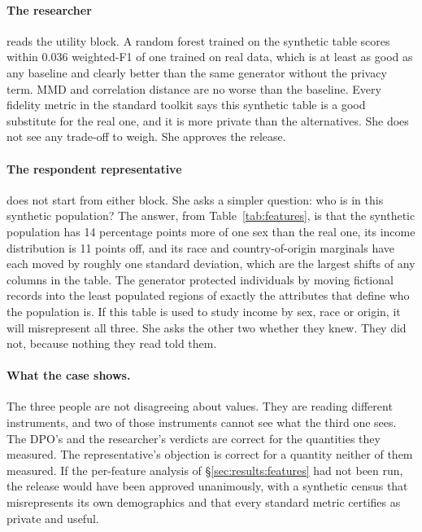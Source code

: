 \documentclass[11pt,a4paper]{article}
\begin{document}
\paragraph{The researcher} reads the utility block. A random forest trained on
the synthetic table scores within $0.036$ weighted-F1 of one trained on real
data, which is at least as good as any baseline and clearly better than the
same generator without the privacy term. MMD and correlation distance are no
worse than the baseline. Every fidelity metric in the standard toolkit says
this synthetic table is a good substitute for the real one, and it is more
private than the alternatives. She does not see any trade-off to weigh. She
approves the release.

\paragraph{The respondent representative} does not start from either block.
She asks a simpler question: who is in this synthetic population? The answer,
from Table~\ref{tab:features}, is that the synthetic population has 14
percentage points more of one sex than the real one, its income distribution
is 11 points off, and its race and country-of-origin marginals have each moved
by roughly one standard deviation, which are the largest shifts of any columns
in the table. The generator protected individuals by moving fictional records
into the least populated regions of exactly the attributes that define who the
population is. If this table is used to study income by sex, race or origin,
it will misrepresent all three. She asks the other two whether they knew. They
did not, because nothing they read told them.

\paragraph{What the case shows.}
The three people are not disagreeing about values. They are reading different
instruments, and two of those instruments cannot see what the third one sees.
The DPO's and the researcher's verdicts are correct for the quantities they
measured. The representative's objection is correct for a quantity neither of
them measured. If the per-feature analysis of \S\ref{sec:results:features} had
not been run, the release would have been approved unanimously, with a
synthetic census that misrepresents its own demographics and that every
standard metric certifies as private and useful.
\end{document}
